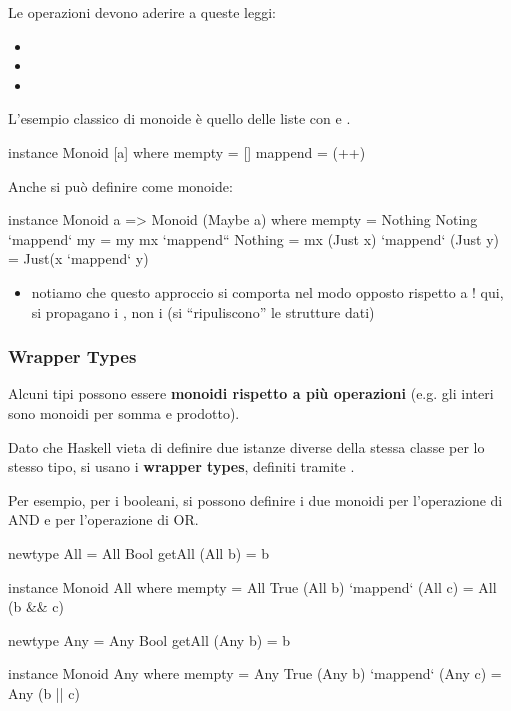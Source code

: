 Le operazioni devono aderire a queste leggi:
\begin{itemize}
    \item {}
    \item {}
    \item {}
\end{itemize}

L'esempio classico di monoide è quello delle liste con \code{[]} e \code{++}.

\begin{haskellbox}{}
instance Monoid [a] where
    mempty = []
    mappend = (++)
\end{haskellbox}

Anche  si può definire come monoide:
\begin{haskellbox}{}
instance Monoid a => Monoid (Maybe a) where
    mempty = Nothing
    Noting `mappend` my = my
    mx `mappend`` Nothing = mx
    (Just x) `mappend` (Just y) = Just(x `mappend` y)
\end{haskellbox}
\begin{itemize}
    \item notiamo che questo approccio si comporta nel modo opposto rispetto a ! qui, si propagano i , non i  (si ``ripuliscono'' le strutture dati)
\end{itemize}

\subsubsection{Wrapper Types}
Alcuni tipi possono essere \textbf{monoidi rispetto a più operazioni} (e.g. gli interi sono monoidi per somma e prodotto). 

Dato che Haskell vieta di definire due istanze diverse della stessa classe per lo stesso tipo, si usano i \textbf{wrapper types}, definiti tramite .

Per esempio, per i booleani, si possono definire i due monoidi  per l'operazione di AND e  per l'operazione di OR.
\begin{haskellbox}{}
newtype All = All Bool
getAll (All b) = b

instance Monoid All where
    mempty = All True
    (All b) `mappend` (All c) = All (b && c)

newtype Any = Any Bool
getAll (Any b) = b

instance Monoid Any where
    mempty = Any True
    (Any b) `mappend` (Any c) = Any (b || c)
\end{haskellbox}

